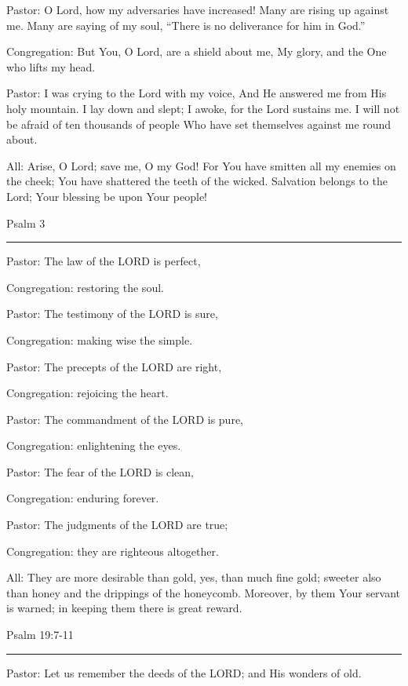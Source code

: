 \documentclass[]{book}
\begin{document}
Pastor: O Lord, how my adversaries have increased! Many are rising up against me. Many are saying of my soul, ``There is no deliverance for him in God.''

Congregation: But You, O Lord, are a shield about me, My glory, and the One who lifts my head.

Pastor: I was crying to the Lord with my voice, And He answered me from His holy mountain. I lay down and slept; I awoke, for the Lord sustains me. I will not be afraid of ten thousands of people Who have set themselves against me round about.

All: Arise, O Lord; save me, O my God! For You have smitten all my enemies on the cheek; You have shattered the teeth of the wicked. Salvation belongs to the Lord; Your blessing be upon Your people!

\textbar{} Psalm 3 \textbar{}

\begin{center}\rule{0.5\linewidth}{\linethickness}\end{center}

Pastor: The law of the LORD is perfect,

Congregation: restoring the soul.

Pastor: The testimony of the LORD is sure,

Congregation: making wise the simple.

Pastor: The precepts of the LORD are right,

Congregation: rejoicing the heart.

Pastor: The commandment of the LORD is pure,

Congregation: enlightening the eyes.

Pastor: The fear of the LORD is clean,

Congregation: enduring forever.

Pastor: The judgments of the LORD are true;

Congregation: they are righteous altogether.

All: They are more desirable than gold, yes, than much fine gold; sweeter also than honey and the drippings of the honeycomb. Moreover, by them Your servant is warned; in keeping them there is great reward.

Psalm 19:7-11 \textbar{}

\begin{center}\rule{0.5\linewidth}{\linethickness}\end{center}

Pastor: Let us remember the deeds of the LORD; and His wonders of old.
\end{document}
